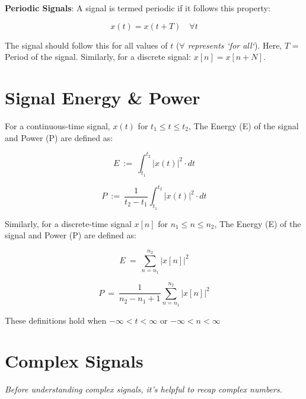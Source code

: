 \documentclass[letterpaper,12pt]{article}
\begin{document}
\textbf{Periodic Signals}: A signal is termed periodic if it follows this property:

\begin{equation}
    x(t) = x(t + T) \quad \forall t
    \label{eq:periodic_signal_condition}
\end{equation}

The signal should follow this for all values of $t$ (\textit{$\forall$
    represents `for all`}). Here, $T$ = Period of the signal. Similarly, for a
discrete signal: \(x[n] = x[n + N]\).

\section{Signal Energy \& Power}
For a continuous-time signal, $x(t)$ for $t_1 \le t \le t_2$, The Energy (E) of
the signal and Power (P) are defined as:

\begin{equation}
    \label{eq:cont_time_energy}
    E\ :=\ \int_{t_{1}}^{t_{2}}\left|x\left(t\right)\right|^{2}\cdot dt
\end{equation}

\begin{equation}
    \label{eq:cont_time_power}
    P\ :=\ \frac{1}{t_{2}-t_{1}}\int_{t_{1}}^{t_{2}}\left|x\left(t\right)\right|^{2}\cdot dt
\end{equation}

Similarly, for a discrete-time signal $x[n]$ for $n_1 \le n \le n_2$, The
Energy (E) of the signal and Power (P) are defined as:

\begin{equation}
    \label{eq:disc_time_energy}
    E\ =\ \sum_{n=n_{1}}^{n_{2}}\left|x\left[n\right]\right|^{2}
\end{equation}

\begin{equation}
    \label{eq:disc_time_power}
    P\ =\ \frac{1}{n_{2}-n_{1}+1}\sum_{n=n_{1}}^{n_{2}}\left|x\left[n\right]\right|^{2}
\end{equation}

These definitions hold when $-\infty < t < \infty$ or $-\infty < n < \infty$

\section{Complex Signals}
\textit{Before understanding complex signals, it's helpful to recap complex numbers.}
\end{document}
